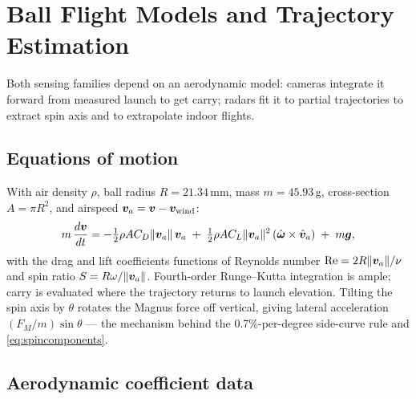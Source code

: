 \chapter{Ball Flight Models and Trajectory Estimation}
\label{ch:flight}

Both sensing families depend on an aerodynamic model: cameras integrate
it forward from measured launch to get carry; radars fit it to partial
trajectories to extract spin axis and to extrapolate indoor flights.

\section{Equations of motion}

With air density $\rho$, ball radius $R = 21.34$\,mm, mass
$m = 45.93$\,g, cross-section $A = \pi R^2$, and airspeed
$\bm{v}_a = \bm{v} - \bm{v}_{\mathrm{wind}}$:
\begin{equation}
\label{eq:eom}
m\,\frac{d\bm{v}}{dt} =
  -\tfrac{1}{2}\rho A C_D \lVert\bm{v}_a\rVert\, \bm{v}_a
  \;+\; \tfrac{1}{2}\rho A C_L \lVert\bm{v}_a\rVert^2
     \,(\hat{\bm{\omega}} \times \hat{\bm{v}}_a)
  \;+\; m\bm{g},
\end{equation}
with the drag and lift coefficients functions of Reynolds number
$\mathrm{Re} = 2R\lVert\bm{v}_a\rVert/\nu$ and spin ratio
$S = R\omega/\lVert\bm{v}_a\rVert$. Fourth-order Runge--Kutta
integration is ample; carry is evaluated where the trajectory returns to
launch elevation. Tilting the spin axis by $\theta$ rotates the Magnus
force off vertical, giving lateral acceleration
$(F_M/m)\sin\theta$ --- the mechanism behind the 0.7\%-per-degree
side-curve rule and \cref{eq:spincomponents}.

\section{Aerodynamic coefficient data}

